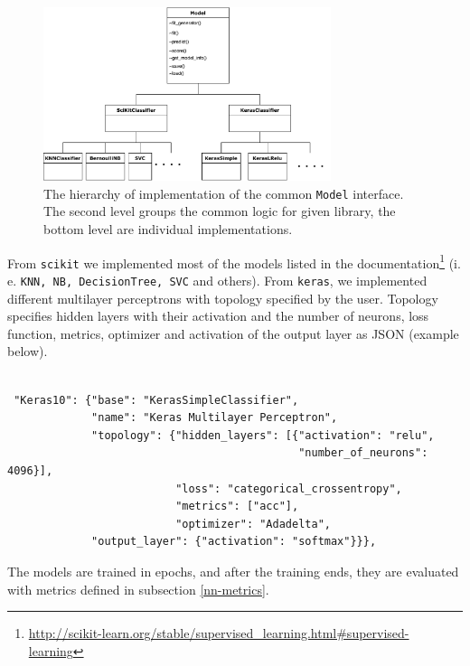 \begin{figure}[H]

\centering
\includegraphics[width=0.75\textwidth]{tex/images/model_inheritance}
\caption{The hierarchy of implementation of the common \texttt{Model} interface. The second level groups the common logic for given library, the bottom level are individual implementations.}
\label{model-inheritance}

\end{figure}

From \texttt{scikit} we implemented most of the models listed in the documentation\footnote{\url{http://scikit-learn.org/stable/supervised\_learning.html\#supervised-learning}} (i. e. \texttt{KNN, NB, DecisionTree, SVC} and others). From \texttt{keras}, we implemented different multilayer perceptrons with topology specified by the user. Topology specifies hidden layers with their activation and the number of neurons, loss function, metrics, optimizer and activation of the output layer as JSON (example below).

\label{models-json}
\begin{verbatim}

 "Keras10": {"base": "KerasSimpleClassifier",
             "name": "Keras Multilayer Perceptron",
             "topology": {"hidden_layers": [{"activation": "relu",
                                             "number_of_neurons": 4096}],
                          "loss": "categorical_crossentropy",
                          "metrics": ["acc"],
                          "optimizer": "Adadelta",
             "output_layer": {"activation": "softmax"}}},

\end{verbatim}

\noindent
The models are trained in epochs, and after the training ends, they are evaluated with metrics defined in subsection \ref{nn-metrics}.

